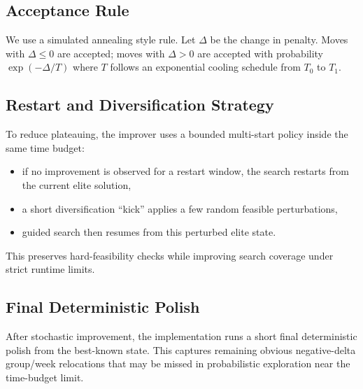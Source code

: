 \subsection{Acceptance Rule}
We use a simulated annealing style rule.
Let $\Delta$ be the change in penalty.
Moves with $\Delta\le 0$ are accepted; moves with $\Delta>0$ are accepted with probability $\exp(-\Delta/T)$ where $T$ follows an exponential cooling schedule from $T_0$ to $T_1$.

\subsection{Restart and Diversification Strategy}
To reduce plateauing, the improver uses a bounded multi-start policy inside the same time budget:
\begin{itemize}[leftmargin=*]
  \item if no improvement is observed for a restart window, the search restarts from the current elite solution,
  \item a short diversification ``kick'' applies a few random feasible perturbations,
  \item guided search then resumes from this perturbed elite state.
\end{itemize}
This preserves hard-feasibility checks while improving search coverage under strict runtime limits.

\subsection{Final Deterministic Polish}
After stochastic improvement, the implementation runs a short final deterministic polish from the best-known state.
This captures remaining obvious negative-delta group/week relocations that may be missed in probabilistic exploration near the time-budget limit.

